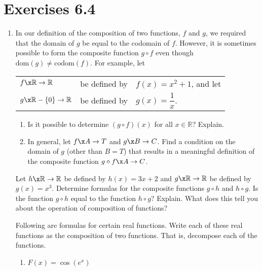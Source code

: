 \section*{Exercises 6.4}
%
\begin{enumerate} 
\item In our definition of the composition of two functions,  $f$  and  $g$, we required that the domain of  $g$  be equal to the codomain of  $f$.  However, it is sometimes possible to form the composite function  $g \circ f$ even though  
$\text{dom}( g ) \ne \text{codom}( f )$.  For example, let
\label{exer:sec64-1}
\begin{center}
\begin{tabular}{l l l}
$f\x \mathbb{R} \to \mathbb{R}$  &  be defined by	 &  $f( x ) = x^2  + 1$, and let \\
$g\x \mathbb{R} - \left\{ 0 \right\} \to \mathbb{R}$  &  be defined by & 
$g( x ) = \dfrac{1}{x}$. \\
\end{tabular}
\end{center}

\begin{enumerate}
  \item Is it possible to determine  $( {g \circ f} )( x )$  for all  
        $x \in \mathbb{R}$?  Explain.

  \item In general, let  $f\x A \to T$ and  $g\x B \to C$.  Find a condition on the domain of  $g$               (other than  $B = T$)  that results in a meaningful definition of the composite function  
   $g \circ f\x A \to C$.
\end{enumerate}


\xitem Let  $h\x \mathbb{R} \to \mathbb{R}$ be defined by  $h( x ) = 3x + 2$ and  $g\x \mathbb{R} \to \mathbb{R}$ be defined by  $g( x ) = x^3 $.  Determine formulas for the composite functions  $g \circ h$  and  $h \circ g$.  Is the function $g \circ h$ equal to the function $h \circ g$?  Explain.  What does this tell you about the operation of composition of functions? \label{exer64:notcommutative}




\xitem Following are formulas for certain real functions.  Write each of these real functions as the composition of two functions.  That is, decompose each of the functions. \label{exer:sec64-2}

\begin{multicols}{2}
\begin{enumerate}
\item $F( x ) = \cos ( {e^x } )$


\end{enumerate}
\end{multicols}
\end{enumerate}
